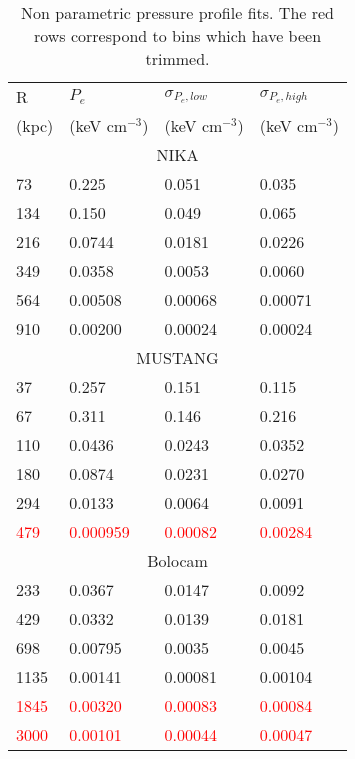 \begin{table}  %
  \caption{\footnotesize{Non parametric pressure profile fits.} The red rows
    correspond to bins which have been trimmed.}
  \begin{center}
    \begin{tabular}{|l|lll|}
      \hline
      R     & $P_e$          & $\sigma_{P_e,low}$ & $\sigma_{P_e,high}$ \\
      (kpc) & (keV cm$^{-3}$) & (keV cm$^{-3}$)   & (keV cm$^{-3}$)   \\
      \hline
      \multicolumn{4}{|c|}{NIKA} \\
      \hline
      73    & 0.225   & 0.051   & 0.035   \\
      134   & 0.150   & 0.049   & 0.065   \\
      216   & 0.0744  & 0.0181  & 0.0226  \\
      349   & 0.0358  & 0.0053  & 0.0060  \\
      564   & 0.00508 & 0.00068 & 0.00071 \\
      910   & 0.00200 & 0.00024 & 0.00024 \\
      \hline
      \multicolumn{4}{|c|}{MUSTANG} \\
      \hline
      37   & 0.257    & 0.151   & 0.115   \\
      67   & 0.311    & 0.146   & 0.216   \\
      110  & 0.0436   & 0.0243  & 0.0352  \\
      180  & 0.0874   & 0.0231  & 0.0270  \\
      294  & 0.0133   & 0.0064  & 0.0091  \\
      \textcolor{red}{479}  & \textcolor{red}{0.000959} &
      \textcolor{red}{0.00082} & \textcolor{red}{0.00284} \\
      \hline
      \multicolumn{4}{|c|}{Bolocam} \\
      \hline
      233  & 0.0367   & 0.0147   & 0.0092  \\
      429  & 0.0332   & 0.0139   & 0.0181  \\
      698  & 0.00795  & 0.0035   & 0.0045  \\
      1135 & 0.00141  & 0.00081  & 0.00104 \\
      \textcolor{red}{1845} & \textcolor{red}{0.00320}  &
      \textcolor{red}{0.00083}  & \textcolor{red}{0.00084} \\
      \textcolor{red}{3000} & \textcolor{red}{0.00101}  &
      \textcolor{red}{0.00044}  & \textcolor{red}{0.00047} \\
      \hline
    \end{tabular}
  \end{center}
  \label{tbl:nppp_res}
\end{table}

